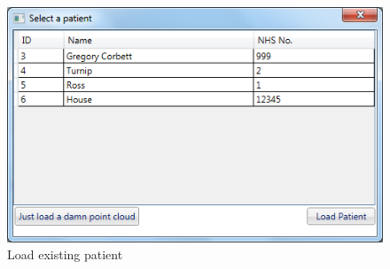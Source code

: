 \begin{figure}[h]
\begin{center}
\includegraphics[scale=0.6]{images/old}
\end{center}
\caption{Load existing patient}
\label{load existing patient}
\end{figure}

